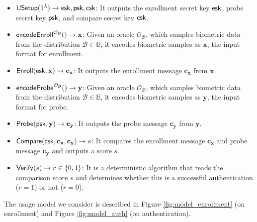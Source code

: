 \begin{itemize}

	\item ${\sf USetup}(1^\lambda) \to {\sf esk}, {\sf psk}, {\sf csk}$: It outputs the enrollment secret key ${\sf esk}$, probe secret key ${\sf psk}$, and compare secret key $\sf csk$.

	\item ${\sf encodeEnroll}^{\mathcal{O}_{\mathcal{B}}}() \to \mathbf{x}$: Given an oracle $\mathcal{O}_{\mathcal{B}}$, which samples biometric data from the distribution $\mathcal{B} \in \mathbb{B}$, it encodes biometric samples as $\mathbf{x}$, the input format for enrollment. 

	\item ${\sf Enroll}({\sf esk}, \mathbf{x}) \to \mathbf{c_x}$: It outputs the enrollment message $\mathbf{c_x}$ from $\mathbf{x}$.

	\item ${\sf encodeProbe}^{\mathcal{O}_{\mathcal{B}}}() \to \mathbf{y}$: Given an oracle $\mathcal{O}_{\mathcal{B}}$, which samples biometric data from the distribution $\mathcal{B} \in \mathbb{B}$, it encodes biometric samples as $\mathbf{y}$, the input format for probe.

	\item ${\sf Probe}({\sf psk}, \mathbf{y}) \to \mathbf{c_y}$: It outputs the probe message $\mathbf{c_y}$ from $\mathbf{y}$.

	\item ${\sf Compare}({\sf csk}, \mathbf{c_x}, \mathbf{c_y)} \to s$: It compares the enrollment message $\mathbf{c_x}$ and probe message $\mathbf{c_y}$ and outputs a score $s$.

	\item ${\sf Verify}(s) \to r \in \{0,1\}$: It is a deterministic algorithm that reads the comparison score $s$ and determines whether this is a successful authentication ($r = 1$) or not ($r = 0$).

\end{itemize}


The usage model we consider is described in Figure \ref{fig:model_enrollment} (on enrollment) and Figure \ref{fig:model_auth} (on authentication).

